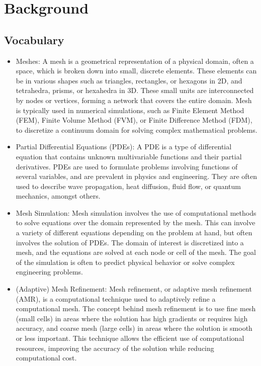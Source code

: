 \documentclass[12pt, a4paper]{article}
\begin{document}
\section{Background}
\subsection{Vocabulary}
\begin{itemize}
\item Meshes: A mesh is a geometrical representation of a physical domain, often a space, 
which is broken down into small, discrete elements. These elements can be in various shapes 
such as triangles, rectangles, or hexagons in 2D, and tetrahedra, prisms, or hexahedra in 3D. 
These small units are interconnected by nodes or vertices, forming a network that covers the 
entire domain. Mesh is typically used in numerical simulations, such as Finite
Element Method (FEM), Finite Volume Method (FVM), or Finite Difference Method (FDM), to 
discretize a continuum domain for solving complex mathematical problems.
\item Partial Differential Equations (PDEs): A PDE is a type of differential equation that 
contains unknown multivariable functions and their partial derivatives. PDEs are used to 
formulate problems involving functions of several variables, and are prevalent in physics 
and engineering. They are often used to describe wave propagation, heat diffusion, fluid flow, 
or quantum mechanics, amongst others.
\item Mesh Simulation: Mesh simulation involves the use of computational methods to 
solve equations over the domain represented by the mesh. This can involve a variety of 
different equations depending on the problem at hand, but often involves the solution 
of PDEs. The domain of interest is discretized into a mesh, and the equations are 
solved at each node or cell of the mesh. The goal of the simulation is often to predict 
physical behavior or solve complex engineering problems.
\item (Adaptive) Mesh Refinement: Mesh refinement, or adaptive mesh refinement (AMR), is 
a computational technique used to adaptively refine a computational mesh. The concept 
behind mesh refinement is to use fine mesh (small cells) in areas where the solution has 
high gradients or requires high accuracy, and coarse mesh (large cells) in areas where 
the solution is smooth or less important. This technique allows the efficient use of 
computational resources, improving the accuracy of the solution while reducing 
computational cost.
\end{itemize}
\end{document}
